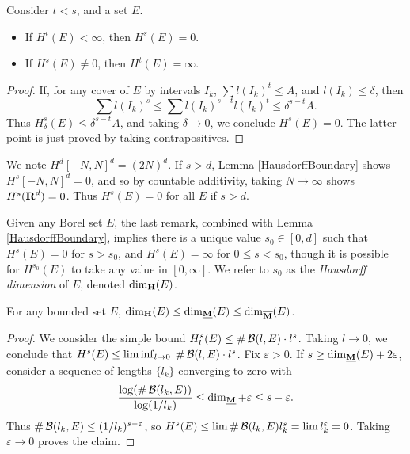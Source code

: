 \begin{lemma} \label{HausdorffBoundary}
	Consider $t < s$, and a set $E$.
	\begin{itemize}
		\item If $H^t(E) < \infty$, then $H^s(E) = 0$.
		\item If $H^s(E) \neq 0$, then $H^t(E) = \infty$.
	\end{itemize}
\end{lemma}
\begin{proof}
	If, for any cover of $E$ by intervals $I_k$, $\sum l(I_k)^t \leq A$, and $l(I_k) \leq \delta$, then
	\[ \sum l(I_k)^s \leq \sum l(I_k)^{s-t} l(I_k)^t \leq \delta^{s-t} A. \]
	Thus $H^s_\delta(E) \leq \delta^{s-t} A$, and taking $\delta \to 0$, we conclude $H^s(E) = 0$. The latter point is just proved by taking contrapositives.
\end{proof}

\begin{remark}
	We note $H^d[-N,N]^d = (2N)^d$. If $s > d$, Lemma \ref{HausdorffBoundary} shows $H^s[-N,N]^d = 0$, and so by countable additivity, taking $N \to \infty$ shows $H^s(\operatorname{\mathbf{R}}^d) = 0$. Thus $H^s(E) = 0$ for all $E$ if $s > d$.
\end{remark}

Given any Borel set $E$, the last remark, combined with Lemma \ref{HausdorffBoundary}, implies there is a unique value $s_0 \in [0,d]$ such that $H^s(E) = 0$ for $s > s_0$, and $H^s(E) = \infty$ for $0 \leq s < s_0$, though it is possible for $H^{s_0}(E)$ to take any value in $[0,\infty]$. We refer to $s_0$ as the \emph{Hausdorff dimension} of $E$, denoted $\operatorname{\dim_{\mathbf{H}}}(E)$.

\begin{theorem}
	For any bounded set $E$, $\operatorname{\dim_{\mathbf{H}}}(E) \leq \operatorname{\dim_{\underline{\mathbf{M}}}}(E) \leq \operatorname{\dim_{\overline{\mathbf{M}}}}(E)$.
\end{theorem}
\begin{proof}
	We consider the simple bound $H^s_l(E) \leq \# \operatorname{\mathcal{B}}(l,E) \cdot l^s$. Taking $l \to 0$, we conclude that $H^s(E) \leq \liminf_{l \to 0}\; \# \operatorname{\mathcal{B}}(l,E) \cdot l^s$. Fix $\varepsilon > 0$. If $s \geq \operatorname{\dim_{\underline{\mathbf{M}}}}(E) + 2\varepsilon$, consider a sequence of lengths $\{ l_k \}$ converging to zero with
	\[ \frac{\log(\# \operatorname{\mathcal{B}}(l_k,E))}{\log(1/l_k)} \leq \operatorname{\dim_{\underline{\mathbf{M}}}} + \varepsilon \leq s - \varepsilon. \]
	Thus $\# \operatorname{\mathcal{B}}(l_k,E) \leq (1/l_k)^{s - \varepsilon}$, so $H^s(E) \leq \lim \# \operatorname{\mathcal{B}}(l_k,E) l_k^s = \lim l_k^\varepsilon = 0$. Taking $\varepsilon \to 0$ proves the claim.
\end{proof}


